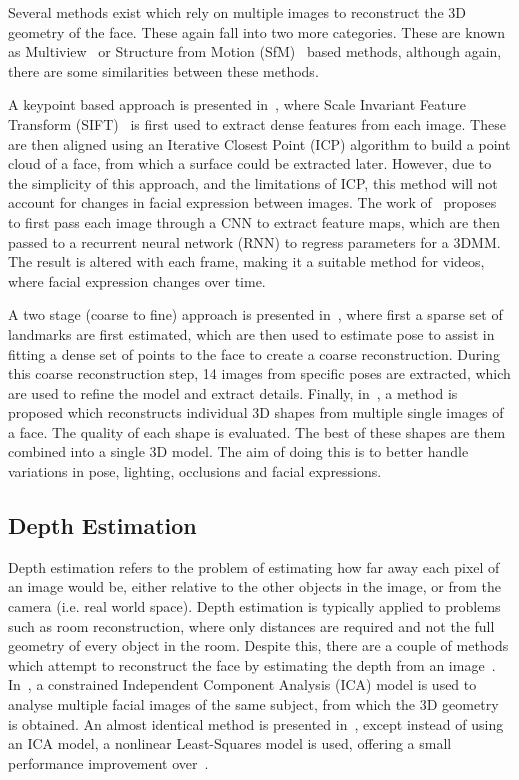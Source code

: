 Several methods exist which rely on multiple images to reconstruct the
3D geometry of the face. These again fall into two more
categories. These are known as
Multiview~\cite{mayo20093d,dou2018multi} or Structure from Motion
(SfM)~\cite{dou2018multi,dai2018coarse,Piotraschke_2016_CVPR} based
methods, although again, there are some similarities between these
methods.

A keypoint based approach is presented in~\cite{mayo20093d}, where
Scale Invariant Feature Transform (SIFT)~\cite{lowe1999object} is
first used to extract dense features from each image. These are then
aligned using an Iterative Closest Point (ICP) algorithm to build a
point cloud of a face, from which a surface could be extracted
later. However, due to the simplicity of this approach, and the
limitations of ICP, this method will not account for changes in facial
expression between images. The work of~\cite{dou2018multi} proposes to
first pass each image through a CNN to extract feature maps, which are
then passed to a recurrent neural network (RNN) to regress parameters
for a 3DMM. The result is altered with each frame, making it a
suitable method for videos, where facial expression changes over time.

A two stage (coarse to fine) approach is presented
in~\cite{dai2018coarse}, where first a sparse set of landmarks are
first estimated, which are then used to estimate pose to assist in
fitting a dense set of points to the face to create a coarse
reconstruction. During this coarse reconstruction step, 14 images from
specific poses are extracted, which are used to refine the model and
extract details. Finally, in~\cite{Piotraschke_2016_CVPR}, a method is
proposed which reconstructs individual 3D shapes from multiple single
images of a face. The quality of each shape is evaluated. The best of
these shapes are them combined into a single 3D model. The aim of
doing this is to better handle variations in pose, lighting,
occlusions and facial expressions.

\subsection{Depth Estimation}

Depth estimation refers to the problem of estimating how far away each
pixel of an image would be, either relative to the other objects in
the image, or from the camera (i.e. real world space). Depth
estimation is typically applied to problems such as room
reconstruction, where only distances are required and not the full
geometry of every object in the room. Despite this, there are a couple
of methods which attempt to reconstruct the face by estimating the
depth from an image~\cite{sun2011depth,sun2013depth}. In~\cite{sun2011depth}, a
constrained Independent Component Analysis (ICA) model is used to
analyse multiple facial images of the same subject, from which the 3D
geometry is obtained. An almost identical method is presented
in~\cite{sun2013depth}, except instead of using an ICA model, a
nonlinear Least-Squares model is used, offering a small performance
improvement over~\cite{sun2011depth}.


